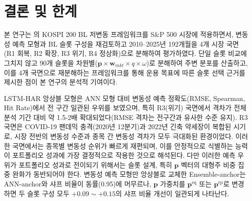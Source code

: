 \documentclass{article}
\begin{document}
\section{결론 및 한계}\label{sec:conclusion}

본 연구는 \citet{pyo2018}의 KOSPI 200 BL 저변동 프레임워크를 S\&P 500 시장에 적용하면서, 변동성 예측 모형과 BL 슬롯 구성을 재검토하고 2010--2025년 192개월을 4개 시장 국면(R1 회복, R2 확장, R3 위기, R4 정상화)으로 분해하여 평가하였다. 단일 슬롯 비교에 그치지 않고 90개 슬롯을 차원별($\mathbf{p} \times \mathbf{w}_{mkt} \times q \times \omega$)로 분해하여 주변 분포를 산출하고, 이를 4개 국면으로 재분해하는 프레임워크를 통해 운용 목표에 따른 슬롯 선택 근거를 제시한 점이 본 연구의 분석적 기여이다.

LSTM-HAR 앙상블 모형은 ANN 모형 대비 변동성 예측 정확도(RMSE, Spearman, Hit Rate)에서 전 구간 일관된 우위를 보였으며, 특히 R3(위기) 국면에서 격차가 전체 분석 기간 대비 약 1.5-2배 확대되었다(RMSE 격차는 전구간과 유사한 수준 유지). R3 국면은 COVID-19 팬데믹 충격(2020년 1\textendash 2분기)과 2022년 긴축 약세장이 복합된 시기로, 시장 전반의 변동성 수준과 종목 간 변동성 격차가 모두 극대화된 환경이었다. 이러한 국면에서는 종목별 변동성 순위가 빠르게 재편되며, 이를 안정적으로 식별하는 능력이 포트폴리오 성과에 가장 결정적으로 작용한 것으로 해석된다. 다만 이러한 예측 우위가 포트폴리오 성과로 전이되기 위해서는 슬롯 설계, 특히 $\mathbf{p}$ 벡터의 대형주 비중 집중 완화가 동반되어야 한다. 변동성 예측 모형만 앙상블로 교체한 Ensemble-anchor는 ANN-anchor와 샤프 비율이 동률(0.95)에 머무르나, $\mathbf{p}$ 가중치를 $\mathbf{p}^{\mathrm{eq}}$ 또는 $\mathbf{p}^{\mathrm{rp}}$로 변경하면 두 슬롯 구성 모두 $+0.09 \sim +0.15$의 샤프 비율 개선이 일관되게 나타난다.
\end{document}
